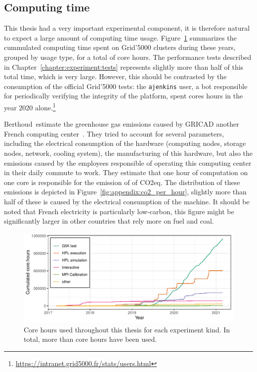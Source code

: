     \subsection*{Computing time}%

        This thesis had a very important experimental component, it is therefore natural to expect a large amount of
        computing time usage. Figure~\ref{fig:appendix:node_hours} summarizes the cummulated computing time spent on
        Grid'5000 clusters during these years, grouped by usage type, for a total of  core hours. The
        performance tests described in Chapter~\ref{chapter:experiment:tests} represents slightly more than half of this
        total time, which is very large. However, this should be contrasted by the consumption of the official Grid'5000
        tests: the \texttt{ajenkins} user, a bot responsible for periodically verifying the integrity of the platform,
        spent  cores hours in the year 2020
        alone.\footnote{\url{https://intranet.grid5000.fr/stats/users.html}}

        Berthoud~\etal estimate the greenhouse gas emissions caused by GRICAD another French computing
        center~\cite{corehour_co2}. They tried to account for several parameters, including the electrical consumption
        of the hardware (computing nodes, storage nodes, network, cooling system), the manufacturing of this hardware,
        but also the emissions caused by the employees responsible of operating this computing center in their daily
        commute to work. They estimate that one hour of computation on one core is responsible for the emission of
         of CO2eq. The distribution of these emissions is depicted in
        Figure~\ref{fig:appendix:co2_per_hour}, slightly more than half of these  is caused by the
        electrical consumption of the machine. It should be noted that French electricity is particularly low-carbon,
        this figure might be significantly larger in other countries that rely more on fuel and coal.

        \begin{figure}[htpb]
            \centering
            \includegraphics[width=\linewidth]{img/appendix/carbon/node_hours.pdf}
            \caption{Core hours used throughout this thesis for each experiment kind. In total, more than
             core hours have been used.}%
            \label{fig:appendix:node_hours}
        \end{figure}

